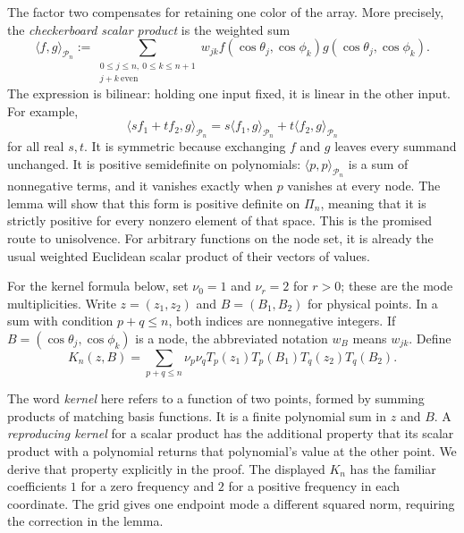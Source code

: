The factor two compensates for retaining one color of the array. More
precisely, the \emph{checkerboard scalar product} is the weighted sum
\[
 \langle f,g\rangle_{\mathcal P_n}
   :=\sum_{\substack{0\leq j\leq n,\ 0\leq k\leq n+1\\j+k\ \mathrm{even}}}
        w_{jk}f(\cos\theta_j,\cos\phi_k)
               g(\cos\theta_j,\cos\phi_k).
\]
The expression is bilinear: holding one input fixed, it is linear in
the other input. For example,
\[
 \langle sf_1+tf_2,g\rangle_{\mathcal P_n}
 =s\langle f_1,g\rangle_{\mathcal P_n}
   +t\langle f_2,g\rangle_{\mathcal P_n}
\]
for all real $s,t$. It is symmetric because exchanging $f$ and $g$
leaves every summand unchanged. It is positive semidefinite
on polynomials:
$\langle p,p\rangle_{\mathcal P_n}$ is a sum of nonnegative terms,
and it vanishes exactly when $p$ vanishes at every node. The lemma will
show that this form is positive definite on $\Pi_n$, meaning that it is
strictly positive for every nonzero element of that space. This is the
promised route to unisolvence. For arbitrary functions on the node set,
it is already the usual weighted Euclidean scalar product of their
vectors of values.

For the kernel formula below, set $\nu_0=1$ and $\nu_r=2$ for $r>0$;
these are the mode multiplicities. Write $z=(z_1,z_2)$ and
$B=(B_1,B_2)$ for physical points. In a sum with condition $p+q\leq n$,
both indices are nonnegative integers. If
$B=(\cos\theta_j,\cos\phi_k)$ is a node, the abbreviated notation
$w_B$ means $w_{jk}$. Define
\[
 K_n(z,B)=\sum_{p+q\leq n}\nu_p\nu_q
 T_p(z_1)T_p(B_1)T_q(z_2)T_q(B_2).
\]

The word \emph{kernel} here refers to a function of two points, formed
by summing products of matching basis functions. It is a finite
polynomial sum in $z$ and $B$. A \emph{reproducing kernel} for a scalar
product has the additional property that its scalar product with a
polynomial returns that polynomial's value at the other point. We
derive that property explicitly in the proof. The displayed $K_n$ has
the familiar coefficients $1$ for a zero frequency and $2$ for a
positive frequency in each coordinate. The grid gives one endpoint
mode a different squared norm, requiring the correction in the lemma.

